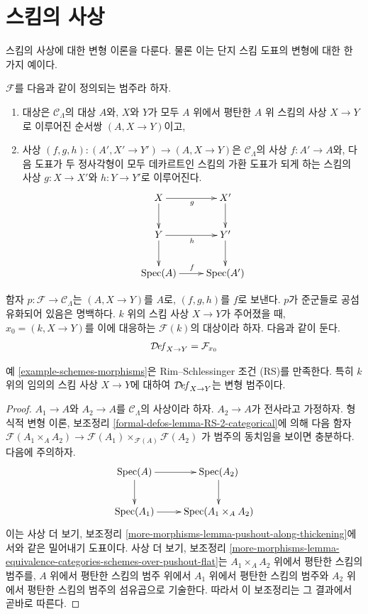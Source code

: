 \section{스킴의 사상}
\label{section-schemes-morphisms}

\noindent
스킴의 사상에 대한 변형 이론을 다룬다. 물론 이는 단지 스킴 도표의
변형에 대한 한 가지 예이다.

\begin{example}[스킴의 사상]
\label{example-schemes-morphisms}
$\mathcal{F}$를 다음과 같이 정의되는 범주라 하자.
\begin{enumerate}
\item 대상은 $\mathcal{C}_\Lambda$의 대상 $A$와, $X$와 $Y$가 모두
$A$ 위에서 평탄한 $A$ 위 스킴의 사상 $X \to Y$로 이루어진 순서쌍
$(A, X \to Y)$이고,
\item 사상 $(f, g, h) : (A', X' \to Y') \to (A, X \to Y)$은
$\mathcal{C}_\Lambda$의 사상 $f : A' \to A$와, 다음 도표가 두 정사각형이
모두 데카르트인 스킴의 가환 도표가 되게 하는 스킴의 사상
$g : X \to X'$와 $h : Y \to Y'$로 이루어진다.
$$
\xymatrix{
X \ar[r]_g \ar[d] & X' \ar[d] \\
Y \ar[r]_h \ar[d] & Y' \ar[d] \\
\Spec(A) \ar[r]^f & \Spec(A')
}
$$
\end{enumerate}
함자 $p : \mathcal{F} \to \mathcal{C}_\Lambda$는 $(A, X \to Y)$를 $A$로,
$(f, g, h)$를 $f$로 보낸다. $p$가 준군들로 공섬유화되어 있음은
명백하다. $k$ 위의 스킴 사상 $X \to Y$가 주어졌을 때,
$x_0 = (k, X \to Y)$를 이에 대응하는 $\mathcal{F}(k)$의 대상이라 하자.
다음과 같이 둔다.
$$
\mathcal{D}\!\mathit{ef}_{X \to Y} = \mathcal{F}_{x_0}
$$
\end{example}

\begin{lemma}
\label{lemma-schemes-morphisms-RS}
예 \ref{example-schemes-morphisms}은 Rim--Schlessinger 조건 (RS)를
만족한다. 특히 $k$ 위의 임의의 스킴 사상 $X \to Y$에 대하여
$\mathcal{D}\!\mathit{ef}_{X \to Y}$는 변형 범주이다.
\end{lemma}

\begin{proof}
$A_1 \to A$와 $A_2 \to A$를 $\mathcal{C}_\Lambda$의 사상이라 하자.
$A_2 \to A$가 전사라고 가정하자. 형식적 변형 이론, 보조정리
\ref{formal-defos-lemma-RS-2-categorical}에 의해 다음 함자
$\mathcal{F}(A_1 \times_A A_2) \to
\mathcal{F}(A_1) \times_{\mathcal{F}(A)} \mathcal{F}(A_2)$
가 범주의 동치임을 보이면 충분하다. 다음에 주의하자.
$$
\xymatrix{
\Spec(A) \ar[r] \ar[d] & \Spec(A_2) \ar[d] \\
\Spec(A_1) \ar[r] &
\Spec(A_1 \times_A A_2)
}
$$
이는 사상 더 보기, 보조정리
\ref{more-morphisms-lemma-pushout-along-thickening}에서와 같은 밀어내기
도표이다. 사상 더 보기, 보조정리
\ref{more-morphisms-lemma-equivalence-categories-schemes-over-pushout-flat}는
$A_1 \times_A A_2$ 위에서 평탄한 스킴의 범주를, $A$ 위에서 평탄한
스킴의 범주 위에서 $A_1$ 위에서 평탄한 스킴의 범주와 $A_2$ 위에서
평탄한 스킴의 범주의 섬유곱으로 기술한다. 따라서 이 보조정리는
그 결과에서 곧바로 따른다.
\end{proof}

